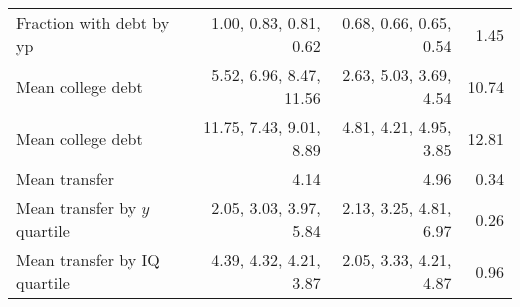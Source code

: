 \begin{tabular}{lrrr}
Fraction with debt by yp & 1.00, 0.83, 0.81, 0.62  & 0.68, 0.66, 0.65, 0.54  & 1.45  \\ 
Mean college debt & 5.52, 6.96, 8.47, 11.56  & 2.63, 5.03, 3.69, 4.54  & 10.74  \\ 
Mean college debt & 11.75, 7.43, 9.01, 8.89  & 4.81, 4.21, 4.95, 3.85  & 12.81  \\ 
Mean transfer & 4.14  & 4.96  & 0.34  \\ 
Mean transfer by $y$ quartile & 2.05, 3.03, 3.97, 5.84  & 2.13, 3.25, 4.81, 6.97  & 0.26  \\ 
Mean transfer by IQ quartile & 4.39, 4.32, 4.21, 3.87  & 2.05, 3.33, 4.21, 4.87  & 0.96  \\ 
\hline
\end{tabular}%
